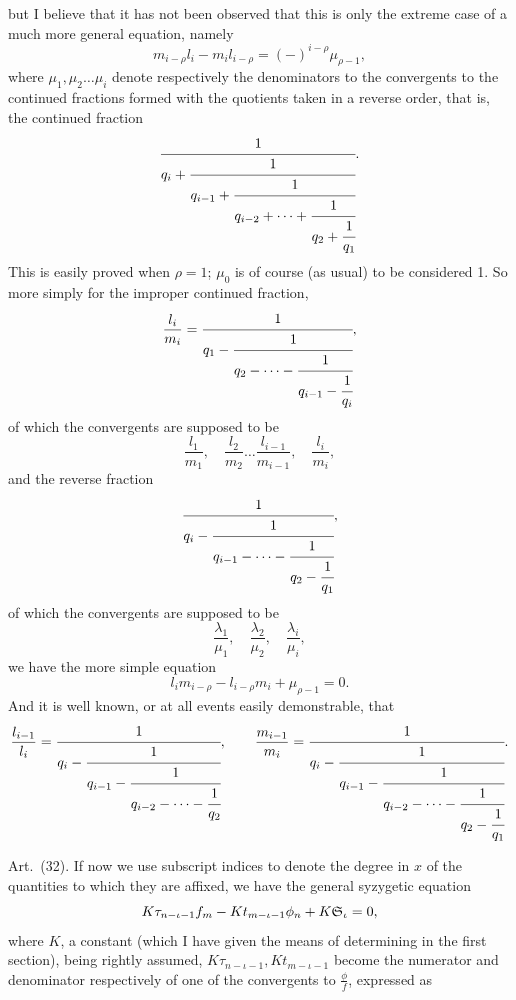 \documentclass[11pt]{article}
\newcommand{\sourcepage}[1]{\marginpar{\scriptsize p.~#1}}
\newcommand{\art}[1]{\par\smallskip\noindent Art.~(#1).\quad}
\begin{document}
\sourcepage{480}
but I believe that it has not been observed that this is only the extreme case of a much more general equation, namely
\[
m_{i-\rho}l_i-m_il_{i-\rho}=(-)^{i-\rho}\mu_{\rho-1},
\]
where $\mu_1,\mu_2\ldots\mu_i$ denote respectively the denominators to the convergents to the continued fractions formed with the quotients taken in a reverse order, that is, the continued fraction
\[
\cfrac1{q_i+\cfrac1{q_{i-1}+\cfrac1{q_{i-2}+\cdots+\cfrac1{q_2+\cfrac1{q_1}}}}}.
\]
This is easily proved when $\rho=1$; $\mu_0$ is of course (as usual) to be considered 1. So more simply for the improper continued fraction,
\[
\frac{l_i}{m_i}=\cfrac1{q_1-\cfrac1{q_2-\cdots-\cfrac1{q_{i-1}-\cfrac1{q_i}}}},
\]
of which the convergents are supposed to be
\[
\frac{l_1}{m_1},\quad\frac{l_2}{m_2}\ldots\frac{l_{i-1}}{m_{i-1}},\quad\frac{l_i}{m_i},
\]
and the reverse fraction
\[
\cfrac1{q_i-\cfrac1{q_{i-1}-\cdots-\cfrac1{q_2-\cfrac1{q_1}}}},
\]
of which the convergents are supposed to be
\[
\frac{\lambda_1}{\mu_1},\quad\frac{\lambda_2}{\mu_2},\quad\frac{\lambda_i}{\mu_i},
\]
we have the more simple equation
\[
l_im_{i-\rho}-l_{i-\rho}m_i+\mu_{\rho-1}=0.
\]
And it is well known, or at all events easily demonstrable, that
\[
\frac{l_{i-1}}{l_i}=\cfrac1{q_i-\cfrac1{q_{i-1}-\cfrac1{q_{i-2}-\cdots-\cfrac1{q_2}}}},
\qquad
\frac{m_{i-1}}{m_i}=\cfrac1{q_i-\cfrac1{q_{i-1}-\cfrac1{q_{i-2}-\cdots-\cfrac1{q_2-\cfrac1{q_1}}}}}.
\]

\art{32} If now we use subscript indices to denote the degree in $x$ of the quantities to which they are affixed, we have the general syzygetic equation
\[
K\tau_{n-\iota-1}f_m-Kt_{m-\iota-1}\phi_n+K\mathfrak{S}_\iota=0,
\]
where $K$, a constant (which I have given the means of determining in the first section), being rightly assumed, $K\tau_{n-\iota-1},Kt_{m-\iota-1}$ become the numerator and denominator respectively of one of the convergents to $\frac{\phi}{f}$, expressed as
\end{document}
